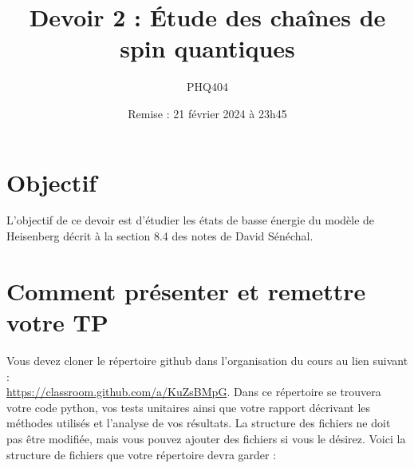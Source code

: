 \documentclass[12pt, letterpaper]{article}
\begin{document}
\title{Devoir 2 : Étude des chaînes de spin quantiques}
\author{PHQ404}
\date{Remise : 21 février 2024 à 23h45}
\maketitle

\section{Objectif}\label{sec:objectif}

\noindent L'objectif de ce devoir est d'étudier les états de basse énergie du modèle
de Heisenberg décrit à la section 8.4 des notes de David Sénéchal.


\section{Comment présenter et remettre votre TP}\label{sec:comment-presenter-et-remettre-votre-tp}

\noindent Vous devez cloner le répertoire github dans l'organisation du cours au lien suivant :\\
\href{https://classroom.github.com/a/KuZsBMpG}{https://classroom.github.com/a/KuZsBMpG}.
Dans ce répertoire se trouvera votre code python, vos tests unitaires ainsi que votre rapport
décrivant les méthodes utilisés et l'analyse de vos résultats.
La structure des fichiers ne doit pas être modifiée, mais vous pouvez ajouter des fichiers si vous le désirez.
Voici la structure de fichiers que votre répertoire devra garder :

\bigskip
\end{document}
